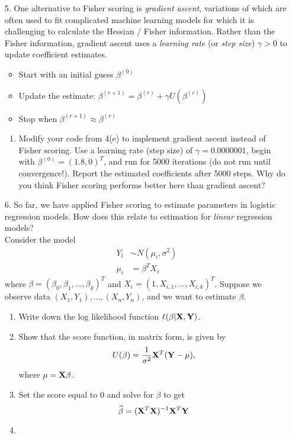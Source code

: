\documentclass[11pt]{article}
\begin{document}
\begin{enumerate}
\begin{enumerate}
\end{enumerate}

\item[5.] One alternative to Fisher scoring is \textit{gradient ascent}, variations of which are often used to fit complicated machine learning models for which it is challenging to calculate the Hessian / Fisher information. Rather than the Fisher information, gradient ascent uses a \textit{learning rate} (or \textit{step size}) $\gamma > 0$ to update coefficient estimates. 

\begin{itemize}
\item Start with an initial guess $\beta^{(0)}$
\item Update the estimate: $\beta^{(r+1)} = \beta^{(r)} + \gamma U(\beta^{(r)})$
\item Stop when $\beta^{(r+1)} \approx \beta^{(r)}$
\end{itemize}

\begin{enumerate}
\item Modify your code from 4(e) to implement gradient ascent instead of Fisher scoring. Use a learning rate (step size) of $\gamma = 0.0000001$, begin with $\beta^{(0)} = (1.8, 0)^T$, and run for 5000 iterations (do not run until convergence!). Report the estimated coefficients after 5000 steps. Why do you think Fisher scoring performs better here than gradient ascent?
\end{enumerate}

\item[6.] So far, we have applied Fisher scoring to estimate parameters in logistic regression models. How does this relate to estimation for \textit{linear} regression models?\\

Consider the model
\begin{align*}
Y_i &\sim N(\mu_i, \sigma^2) \\
\mu_i &= \beta^T X_i
\end{align*}
where $\beta = (\beta_0, \beta_1, ..., \beta_k)^T$ and $X_i = (1, X_{i,1},...,X_{i,k})^T$. Suppose we observe data $(X_1,Y_1),...,(X_n,Y_n)$, and we want to estimate $\beta$.

\begin{enumerate}
\item Write down the log likelihood function $\ell(\beta | {\bf X}, {\bf Y})$.

\item Show that the score function, in matrix form, is given by
$$U(\beta) = \frac{1}{\sigma^2} {\bf X}^T ({\bf Y} - \mu),$$
where $\mu = {\bf X} \beta$.

\item Set the score equal to 0 and solve for $\beta$ to get
$$\widehat{\beta} = ({\bf X}^T {\bf X})^{-1} {\bf X}^T {\bf Y}$$

\item 
\end{enumerate}

\end{enumerate}
\end{document}
